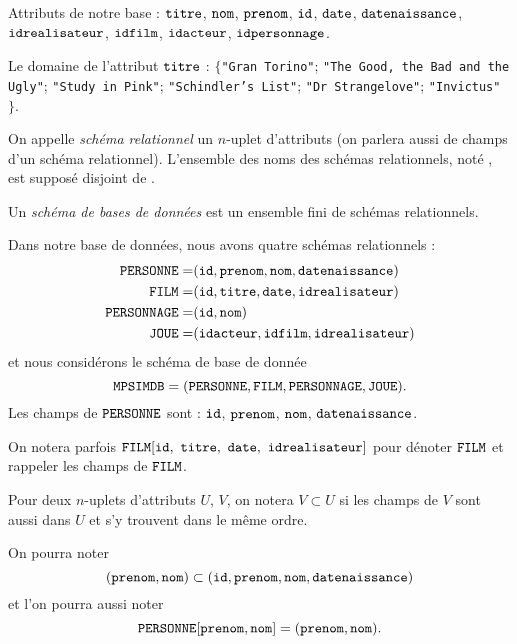 \begin{exemple}
  Attributs de notre base : $\mathtt{titre}$, $\mathtt{nom}$,
$\mathtt{prenom}$, $\mathtt{id}$,
$\mathtt{date}$, $\mathtt{datenaissance}$, $\mathtt{idrealisateur}$, $\mathtt{idfilm}$, $\mathtt{idacteur}$, $\mathtt{idpersonnage}$. 

Le domaine de l'attribut $\mathtt{titre}$ : $\{$\texttt{"Gran Torino"}; \texttt{"The Good, the Bad and the Ugly"}; \texttt{"Study in Pink"}; \texttt{"Schindler's List"}; \texttt{"Dr Strangelove"}; \texttt{"Invictus"} $\}$. 
\end{exemple}


\begin{defi}[Schémas]
  On appelle \emph{schéma relationnel} un $n$-uplet d'attributs (on parlera aussi de champs d'un schéma relationnel). L'ensemble des noms des schémas relationnels, noté \relname, est supposé disjoint de \att. 
  
  Un \emph{schéma de bases de données} est un ensemble fini de schémas relationnels.
\end{defi}


\begin{exemple}
  Dans notre base de données, nous avons quatre schémas relationnels : 
  \begin{align*}
    \mathtt{PERSONNE} = & (\mathtt{id},\mathtt{prenom},\mathtt{nom},\mathtt{datenaissance}) \\
    \mathtt{FILM} = & (\mathtt{id},\mathtt{titre},\mathtt{date},\mathtt{idrealisateur}) \\
    \mathtt{PERSONNAGE} = & (\mathtt{id},\mathtt{nom}) \\
    \mathtt{JOUE} = & (\mathtt{idacteur}, \mathtt{idfilm}, \mathtt{idrealisateur})
  \end{align*}
  et nous considérons le schéma de base de donnée 
  \begin{equation*}
    \texttt{MPSIMDB} = (\mathtt{PERSONNE},\mathtt{FILM},\mathtt{PERSONNAGE},\mathtt{JOUE}).
  \end{equation*}
  Les champs de $\mathtt{PERSONNE}$ sont : $\mathtt{id}$, $\mathtt{prenom}$, $\mathtt{nom}$, $\mathtt{datenaissance}$.
\end{exemple}





On notera parfois $\FILM[\ttid,\ \tttitre,\ \ttdate,\ \ttidr]$ pour dénoter $\mathtt{FILM}$
et rappeler les champs de $\mathtt{FILM}$.

Pour deux $n$-uplets d'attributs $U$, $V$, on notera $V \subset U$ si les champs de $V$ sont aussi dans $U$ et s'y trouvent dans le même ordre. 
\begin{exemple}
  On pourra noter 
  \begin{equation*}
    (\mathtt{prenom},\mathtt{nom}) \subset (\mathtt{id},\mathtt{prenom},\mathtt{nom},\mathtt{datenaissance})
  \end{equation*}
  et l'on pourra aussi noter 
  \begin{equation*}
    \mathtt{PERSONNE}[\mathtt{prenom},\mathtt{nom}] = (\mathtt{prenom},\mathtt{nom}).
  \end{equation*}
\end{exemple}



